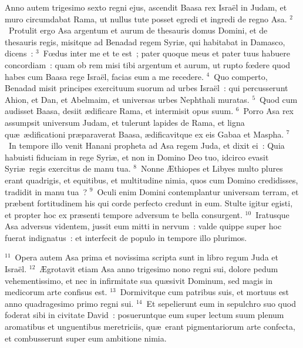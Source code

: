\lettrine[lines=10,image=true,loversize=0.05,lraise=-0.03]{A}{}nno autem trigesimo sexto regni ejus, ascendit Baasa rex Isra\"el in Judam, et muro circumdabat Rama, ut nullus tute posset egredi et ingredi de regno Asa.
${}^{2}$~Protulit ergo Asa argentum et aurum de thesauris domus Domini, et de thesauris regis, misitque ad Benadad regem Syri\ae , qui habitabat in Damasco, dicens~:
${}^{3}$~Fœdus inter me et te est~; pater quoque meus et pater tuus habuere concordiam~: quam ob rem misi tibi argentum et aurum, ut rupto fœdere quod habes cum Baasa rege Isra\"el, facias eum a me recedere.
${}^{4}$~Quo comperto, Benadad misit principes exercituum suorum ad urbes Isra\"el~: qui percusserunt Ahion, et Dan, et Abelmaim, et universas urbes Nephthali muratas.
${}^{5}$~Quod cum audisset Baasa, desiit \ae dificare Rama, et intermisit opus suum.
${}^{6}$~Porro Asa rex assumpsit universum Judam, et tulerunt lapides de Rama, et ligna qu\ae\ \ae dificationi pr\ae paraverat Baasa, \ae dificavitque ex eis Gabaa et Maspha.
${}^{7}$~In tempore illo venit Hanani propheta ad Asa regem Juda, et dixit ei~: Quia habuisti fiduciam in rege Syri\ae , et non in Domino Deo tuo, idcirco evasit Syri\ae\ regis exercitus de manu tua.
${}^{8}$~Nonne \AE thiopes et Libyes multo plures erant quadrigis, et equitibus, et multitudine nimia, quos cum Domino credidisses, tradidit in manu tua~?
${}^{9}$~Oculi enim Domini contemplantur universam terram, et pr\ae bent fortitudinem his qui corde perfecto credunt in eum. Stulte igitur egisti, et propter hoc ex pr\ae senti tempore adversum te bella consurgent.
${}^{10}$~Iratusque Asa adversus videntem, jussit eum mitti in nervum~: valde quippe super hoc fuerat indignatus~: et interfecit de populo in tempore illo plurimos.


${}^{11}$~Opera autem Asa prima et novissima scripta sunt in libro regum Juda et Isra\"el.
${}^{12}$~\AE grotavit etiam Asa anno trigesimo nono regni sui, dolore pedum vehementissimo, et nec in infirmitate sua qu\ae sivit Dominum, sed magis in medicorum arte confisus est.
${}^{13}$~Dormivitque cum patribus suis, et mortuus est anno quadragesimo primo regni sui.
${}^{14}$~Et sepelierunt eum in sepulchro suo quod foderat sibi in civitate David~: posueruntque eum super lectum suum plenum aromatibus et unguentibus meretriciis, qu\ae\ erant pigmentariorum arte confecta, et combusserunt super eum ambitione nimia.

